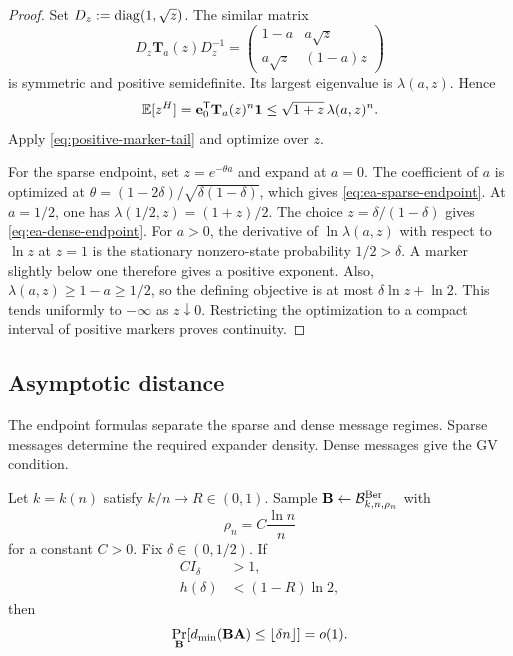 \begin{proof}
Set $D_z:=\operatorname{diag}(1,\sqrt z)$.  The similar matrix
\[
 D_z\mathbf T_a(z)D_z^{-1}
 =\begin{pmatrix}1-a&a\sqrt z\\a\sqrt z&(1-a)z\end{pmatrix}
\]
is symmetric and positive semidefinite.  Its largest eigenvalue is
$\lambda(a,z)$.  Hence
\[
 \mathbb E[z^H]
 =\mathbf e_0^{\mathsf T}\mathbf T_a(z)^n\mathbf 1
 \leq\sqrt{1+z}\,\lambda(a,z)^n.
\]
Apply \eqref{eq:positive-marker-tail} and optimize over $z$.

For the sparse endpoint, set $z=e^{-\theta a}$ and expand at $a=0$.
The coefficient of $a$ is optimized at
$\theta=(1-2\delta)/\sqrt{\delta(1-\delta)}$, which gives
\eqref{eq:ea-sparse-endpoint}.  At $a=1/2$, one has
$\lambda(1/2,z)=(1+z)/2$.  The choice $z=\delta/(1-\delta)$ gives
\eqref{eq:ea-dense-endpoint}.  For $a>0$, the derivative of
$\ln\lambda(a,z)$ with respect to $\ln z$ at $z=1$ is the stationary
nonzero-state probability $1/2>\delta$.  A marker slightly below one
therefore gives a positive exponent.  Also, $\lambda(a,z)\geq1-a\geq1/2$,
so the defining objective is at most $\delta\ln z+\ln2$.
This tends uniformly to $-\infty$ as $z\downarrow0$.  Restricting the
optimization to a compact interval of positive markers proves continuity.
\end{proof}

\subsection{Asymptotic distance}

The endpoint formulas separate the sparse and dense message regimes.  Sparse
messages determine the required expander density.  Dense messages give the GV
condition.

\begin{theorem}
\label{thm:ea-distance}
Let $k=k(n)$ satisfy $k/n\to R\in(0,1)$.  Sample
$\mathbf B\gets\mathcal B^{\mathrm{Ber}}_{k,n,\rho_n}$ with
\begin{equation}
 \rho_n=C\frac{\ln n}{n}
 \label{eq:ea-density}
\end{equation}
for a constant $C>0$.  Fix $\delta\in(0,1/2)$.  If
\begin{align}
 C I_\delta&>1,
 \label{eq:ea-sparse-condition}\\
 h(\delta)&<(1-R)\ln2,
 \label{eq:ea-gv-condition}
\end{align}
then
\begin{equation}
 \Pr_{\mathbf B}\!\left[d_{\min}(\mathbf B\mathbf A)\leq\lfloor\delta n\rfloor\right]
 =o(1).
 \label{eq:ea-distance-conclusion}
\end{equation}
\end{theorem}

